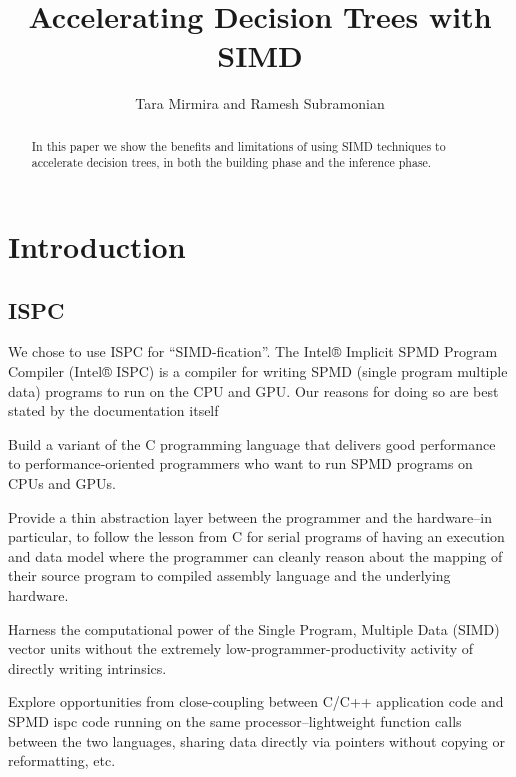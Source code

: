 \documentclass[12pt,letterpaper]{article}
\begin{document}
\title{Accelerating Decision Trees with SIMD}
\author{Tara Mirmira and Ramesh Subramonian}
\maketitle
\thispagestyle{fancy}
\lhead{}
\chead{}
\rhead{}
\lfoot{}
\rfoot{{\small \thepage}}

\begin{abstract}
In this paper we show the benefits and limitations of using SIMD techniques to
  accelerate decision trees, in both the building phase and the inference phase. 
\end{abstract}

\section{Introduction}

\TBC

\subsection{ISPC}

We chose to use ISPC for ``SIMD-fication''. The Intel® Implicit SPMD Program
Compiler (Intel® ISPC) is a compiler for writing SPMD (single program multiple
data) programs to run on the CPU and GPU.
Our reasons for doing so are best stated by the documentation itself
{\em 
\be
\item 
Build a variant of the C programming language that delivers good performance to performance-oriented programmers who want to run SPMD programs on CPUs and GPUs.
\item 
Provide a thin abstraction layer between the programmer and the hardware--in particular, to follow the lesson from C for serial programs of having an execution and data model where the programmer can cleanly reason about the mapping of their source program to compiled assembly language and the underlying hardware.
\item 
Harness the computational power of the Single Program, Multiple Data (SIMD) vector units without the extremely low-programmer-productivity activity of directly writing intrinsics.
\item 
Explore opportunities from close-coupling between C/C++ application code and SPMD ispc code running on the same processor--lightweight function calls between the two languages, sharing data directly via pointers without copying or reformatting, etc.
\ee
}
\end{document}
